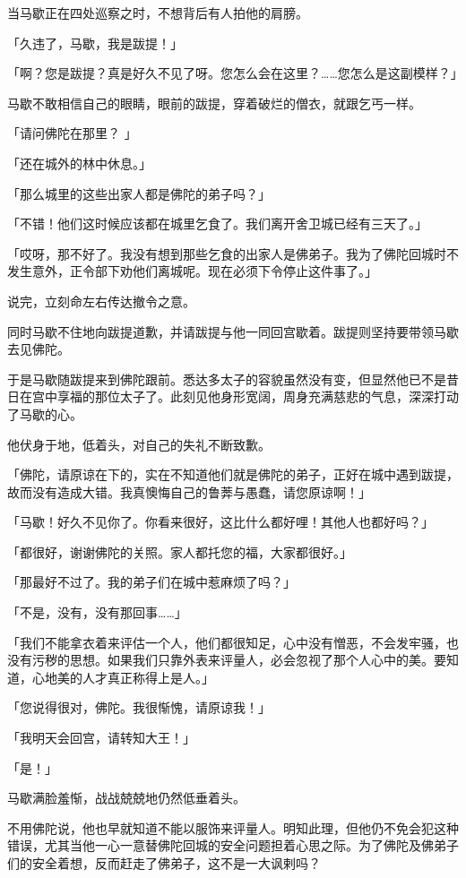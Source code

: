 \documentclass[twoside,openany]{book}
\begin{document}
当马歇正在四处巡察之时，不想背后有人拍他的肩膀。

「久违了，马歇，我是跋提！」

「啊？您是跋提？真是好久不见了呀。您怎么会在这里？……您怎么是这副模样？」

马歇不敢相信自己的眼睛，眼前的跋提，穿着破烂的僧衣，就跟乞丐一样。

「请问佛陀在那里？	」

「还在城外的林中休息。」

「那么城里的这些出家人都是佛陀的弟子吗？」

「不错！他们这时候应该都在城里乞食了。我们离开舍卫城已经有三天了。」

「哎呀，那不好了。我没有想到那些乞食的出家人是佛弟子。我为了佛陀回城时不发生意外，正令部下劝他们离城呢。现在必须下令停止这件事了。」

说完，立刻命左右传达撤令之意。

同时马歇不住地向跋提道歉，并请跋提与他一同回宫歇着。跋提则坚持要带领马歇去见佛陀。

于是马歇随跋提来到佛陀跟前。悉达多太子的容貌虽然没有变，但显然他已不是昔日在宫中享福的那位太子了。此刻见他身形宽阔，周身充满慈悲的气息，深深打动了马歇的心。

他伏身于地，低着头，对自己的失礼不断致歉。

「佛陀，请原谅在下的，实在不知道他们就是佛陀的弟子，正好在城中遇到跋提，故而没有造成大错。我真懊悔自己的鲁莾与愚蠢，请您原谅啊！」

「马歇！好久不见你了。你看来很好，这比什么都好哩！其他人也都好吗？」

「都很好，谢谢佛陀的关照。家人都托您的福，大家都很好。」

「那最好不过了。我的弟子们在城中惹麻烦了吗？」

「不是，没有，没有那回事……」

「我们不能拿衣着来评估一个人，他们都很知足，心中没有憎恶，不会发牢骚，也没有污秽的思想。如果我们只靠外表来评量人，必会忽视了那个人心中的美。要知道，心地美的人才真正称得上是人。」

「您说得很对，佛陀。我很惭愧，请原谅我！」

「我明天会回宫，请转知大王！」

「是！」

马歇满脸羞惭，战战兢兢地仍然低垂着头。

不用佛陀说，他也早就知道不能以服饰来评量人。明知此理，但他仍不免会犯这种错误，尤其当他一心一意替佛陀回城的安全问题担着心思之际。为了佛陀及佛弟子们的安全着想，反而赶走了佛弟子，这不是一大讽剌吗？
\end{document}
